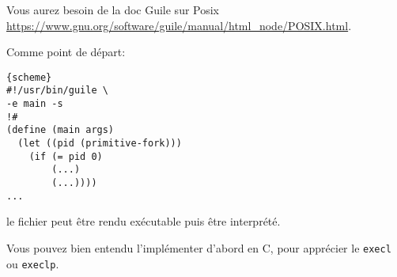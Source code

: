 \documentclass{exam}
\begin{document}
\begin{questions}
  Vous aurez besoin de la doc Guile sur Posix
  \url{https://www.gnu.org/software/guile/manual/html_node/POSIX.html}.

  Comme point de d\'epart:
\begin{verbatim}{scheme}
#!/usr/bin/guile \
-e main -s
!#
(define (main args)
  (let ((pid (primitive-fork)))
    (if (= pid 0)
        (...)
        (...))))
...
\end{verbatim}
  le fichier peut être rendu exécutable puis être interprété.

  Vous pouvez bien entendu l'implémenter d'abord en C, pour apprécier le
  \texttt{execl} ou \texttt{execlp}.
\end{questions}
\end{document}
